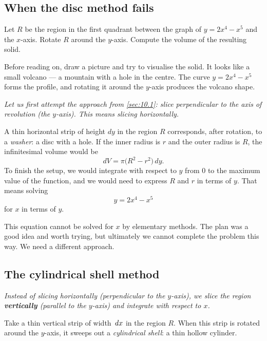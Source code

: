 \subsection*{When the disc method fails}

\begin{example}
\label{ex:10-2}
Let $R$ be the region in the first quadrant between the graph of $y = 2x^{4} - x^{5}$ and the $x$-axis.  Rotate $R$ around the $y$-axis.  Compute the volume of the resulting solid.
\end{example}

\begin{remark}
Before reading on, draw a picture and try to visualise the solid.  It looks like a small volcano --- a mountain with a hole in the centre.  The curve $y = 2x^{4} - x^{5}$ forms the profile, and rotating it around the $y$-axis produces the volcano shape.
\end{remark}

\textit{Let us first attempt the approach from \cref{sec:10.1}: slice perpendicular to the axis of revolution (the $y$-axis).  This means slicing horizontally.}

A thin horizontal strip of height $dy$ in the region $R$ corresponds, after rotation, to a \emph{washer}: a disc with a hole.  If the inner radius is $r$ and the outer radius is $R$, the infinitesimal volume would be
\[
  dV = \pi\bigl(R^{2} - r^{2}\bigr)\,dy.
\]
To finish the setup, we would integrate with respect to $y$ from $0$ to the maximum value of the function, and we would need to express $R$ and $r$ in terms of $y$.  That means solving
\[
  y = 2x^{4} - x^{5}
\]
for $x$ in terms of $y$.

\begin{remark}[Warning]
This equation cannot be solved for $x$ by elementary methods.  The plan was a good idea and worth trying, but ultimately we cannot complete the problem this way.  We need a different approach.
\end{remark}

\subsection*{The cylindrical shell method}

\textit{Instead of slicing horizontally (perpendicular to the $y$-axis), we slice the region \textbf{vertically} (parallel to the $y$-axis) and integrate with respect to $x$.}

Take a thin vertical strip of width $\,dx$ in the region $R$.  When this strip is rotated around the $y$-axis, it sweeps out a \emph{cylindrical shell}: a thin hollow cylinder.

